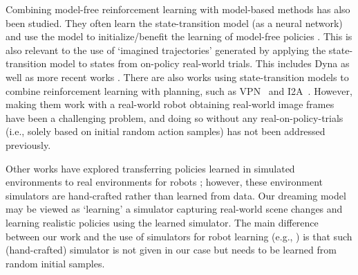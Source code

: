 \documentclass[letterpaper, 10 pt, conference]{ieeeconf}
\begin{document}
Combining model-free reinforcement learning with model-based methods has also been studied. They often learn the state-transition model (as a neural network) and use the model to initialize/benefit the learning of model-free policies \cite{nagabandi2017neural,pong2018temporal}. This is also relevant to the use of `imagined trajectories' generated by applying the state-transition model to states from on-policy real-world trials. This includes Dyna \cite{sutton1990integrated} as well as more recent works \cite{gu2016continuous,venkatraman2016improved,silver2016predictron}. There are also works using state-transition models to combine reinforcement learning with planning, such as VPN~\cite{oh2017value} and I2A~\cite{weber2017imagination}. However, making them work with a real-world robot obtaining real-world image frames have been a challenging problem, and doing so without any real-on-policy-trials (i.e., solely based on initial random action samples) has not been addressed previously.


Other works have explored transferring policies learned in simulated environments to real environments for robots \cite{taylor2009transfer,tzeng2015towards,christiano2016transfer}; however, these environment simulators are hand-crafted rather than learned from data. Our dreaming model may be viewed as `learning' a simulator capturing real-world scene changes and learning realistic policies using the learned simulator. The main difference between our work and the use of simulators for robot learning (e.g., \cite{tobin2017domain}) is that such (hand-crafted) simulator is not given in our case but needs to be learned from random initial samples.


\end{document}
